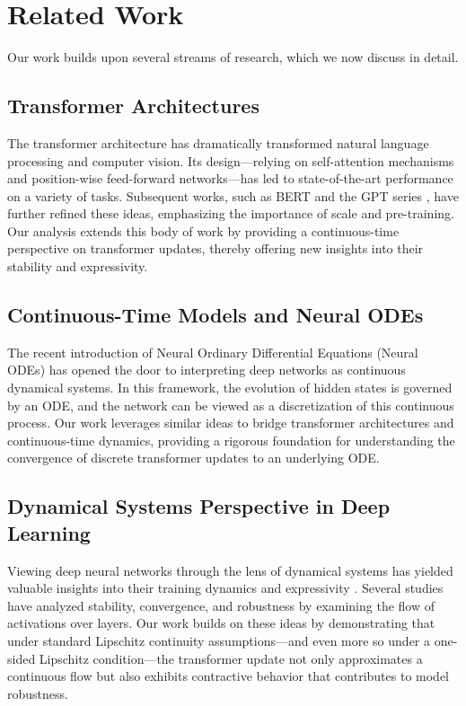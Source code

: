 
\section{Related Work}

Our work builds upon several streams of research, which we now discuss in detail.

\subsection{Transformer Architectures}
The transformer architecture \citep{vaswani2017attention} has dramatically transformed natural language processing and computer vision. Its design—relying on self-attention mechanisms and position-wise feed-forward networks—has led to state-of-the-art performance on a variety of tasks. Subsequent works, such as BERT \citep{devlin2019bert} and the GPT series \citep{radford2018improving,radford2019language}, have further refined these ideas, emphasizing the importance of scale and pre-training. Our analysis extends this body of work by providing a continuous-time perspective on transformer updates, thereby offering new insights into their stability and expressivity.

\subsection{Continuous-Time Models and Neural ODEs}
The recent introduction of Neural Ordinary Differential Equations (Neural ODEs) \citep{Chen2018NeuralODEs} has opened the door to interpreting deep networks as continuous dynamical systems. In this framework, the evolution of hidden states is governed by an ODE, and the network can be viewed as a discretization of this continuous process. Our work leverages similar ideas to bridge transformer architectures and continuous-time dynamics, providing a rigorous foundation for understanding the convergence of discrete transformer updates to an underlying ODE.

\subsection{Dynamical Systems Perspective in Deep Learning}
Viewing deep neural networks through the lens of dynamical systems has yielded valuable insights into their training dynamics and expressivity \citep{ruthotto2018deep,haber2017stable}. Several studies have analyzed stability, convergence, and robustness by examining the flow of activations over layers. Our work builds on these ideas by demonstrating that under standard Lipschitz continuity assumptions—and even more so under a one-sided Lipschitz condition—the transformer update not only approximates a continuous flow but also exhibits contractive behavior that contributes to model robustness.

